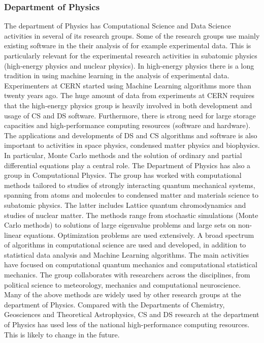 \documentclass[a4paper,10pt]{article}
\begin{document}
\subsubsection*{Department of Physics}

The department of Physics has Computational Science and Data Science activities in several of its research groups. Some of the research groups use mainly existing software in the their analysis of for example experimental data. This is particularly relevant for the experimental research activities in subatomic physics (high-energy physics and nuclear physics). In high-energy physics there is a long tradition in using machine learning in the analysis of experimental data. Experimenters at CERN started using Machine Learning algorithms more than twenty years ago. The huge amount of data from experiments at CERN requires that the  high-energy physics group is heavily involved in both development and usage of CS and DS software. Furthermore, there is strong need for large storage capacities and high-performance computing resources (software and hardware).  
The applications and developments of DS and CS algorithms and software is also important to activities in space physics, condensed matter physics and biophysics. In particular, Monte Carlo methods and  the solution of ordinary and partial differential equations play a central role. 
The Department of Physics has also a group in Computational Physics. The group has worked with computational methods tailored to studies of strongly interacting quantum mechanical systems, spanning from atoms and molecules to condensed matter and materials science to subatomic physics. The latter includes Lattice quantum chromodynamics and studies of nuclear matter. The methods range from stochastic simulations (Monte Carlo methods) to solutions of large eigenvalue problems and large sets on non-linear equations. Optimization problems are used extensively. A broad spectrum of algorithms in computational science are used and developed, in addition to statistical data analysis and Machine Learning algorithms. The main activities have focused on computational quantum mechanics and computational statistical mechanics. The group collaborates with researchers across the disciplines, from political science to meteorology, mechanics and computational neuroscience.  Many of the above methods are widely used by other research groups at the department of Physics. Compared with the Departments of Chemistry, Geosciences and Theoretical Astrophysics, CS and DS research at the department of Physics has used less of the national high-performance computing resources. This is likely to change in the future.
\end{document}
